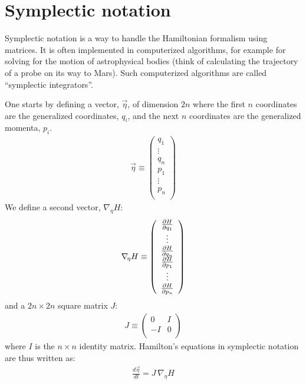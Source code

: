 \section{Symplectic notation}
Symplectic notation is a way to handle the Hamiltonian formalism using matrices. It is often implemented in computerized algorithms, for example for solving for the motion of astrophysical bodies (think of calculating the trajectory of a probe on its way to Mars). Such computerized algorithms are called ``symplectic integrators''.

One starts by defining a vector, $\vec\eta$, of dimension $2n$ where the first $n$ coordinates are the generalized coordinates, $q_i$, and the next $n$ coordinates are the generalized momenta, $p_i$.
\begin{align}
\vec\eta\equiv\left(\begin{array}{c}
 q_1 \\ \vdots \\  q_n \\ p_1 \\ \vdots \\ p_n \\
\end{array} \right)
\end{align}
We define a second vector, $\nabla_{\!\eta} H$:
\begin{align}
\nabla_{\!\eta} H\equiv\left(\begin{array}{c}
 \frac{\partial H}{\partial q_1} \\ \vdots \\ \frac{\partial H}{\partial q_n} \\ \frac{\partial H}{\partial p_1} \\ \vdots \\ \frac{\partial H}{\partial p_n} \\
\end{array} \right)
\end{align}
and a $2n\times 2n$ square matrix $J$:
\begin{align}
J\equiv\left(\begin{array}{cc}
 0 &I \\  -I &0 \\
\end{array} \right)
\end{align}
where $I$ is the $n\times n$ identity matrix. Hamilton's equations in symplectic notation are thus written as:
\begin{align}
\frac{d\vec\eta}{dt}=J\,\nabla_{\!\eta} H
\end{align}

